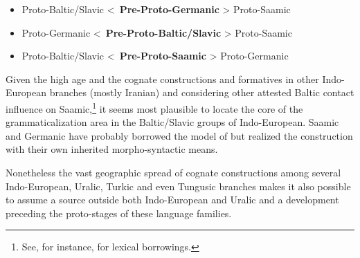 \begin{itemize}
\item	\begin{center}Proto\hyp{}Baltic\slash{}Slavic <~\textbf{Pre-Proto\hyp{}Germanic} > Proto\hyp{}Saamic\end{center}
\item	\begin{center}Proto\hyp{}Germanic <~\textbf{Pre-Proto\hyp{}Baltic\slash{}Slavic} > Proto\hyp{}Saamic\end{center}
\item \begin{center}Proto\hyp{}Baltic\slash{}Slavic <~\textbf{Pre-Proto\hyp{}Saamic} > Proto\hyp{}Germanic\end{center}
\end{itemize}
Given the high age and the cognate constructions and formatives in other Indo-European branches (mostly Iranian) and considering other attested Baltic contact influence on Saamic,\footnote{See, for instance, \citealt{riesler2009} for lexical borrowings.} it seems most plausible to locate the core of the grammaticalization area in the Baltic\slash{}Slavic groups of Indo-European. Saamic and Germanic have probably borrowed the model of  but realized the construction with their own inherited morpho-syntactic means.

Nonetheless the vast geographic spread of cognate constructions among several Indo-European, Uralic, Turkic and even Tungusic branches makes it also possible to assume a source outside both Indo-European and Uralic and a development preceding the proto-stages of these language families.
